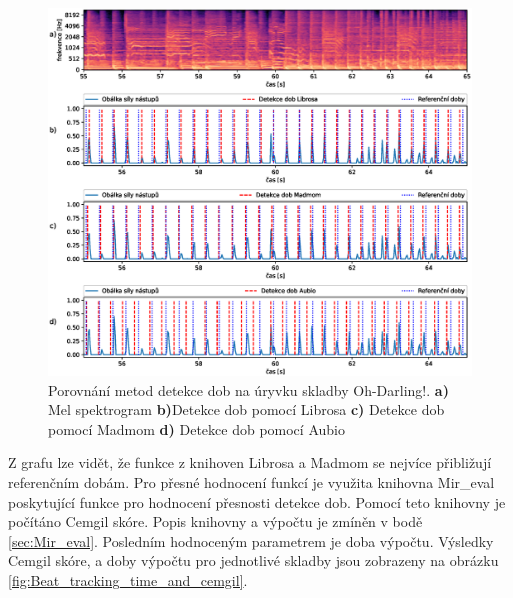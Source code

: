 \begin{figure}[H]
    \centering
    \includegraphics[width = 1\linewidth]{obrazky/Oh-Darling_Beat_analysis_graphs.eps}
    \caption{Porovnání metod detekce dob na úryvku skladby Oh-Darling!. \textbf{a)} Mel spektrogram \textbf{b)}Detekce dob pomocí Librosa \textbf{c)} Detekce dob pomocí Madmom \textbf{d)} Detekce dob pomocí Aubio}
    \label{fig:Oh-Darling_beat_analysis}
\end{figure}

Z grafu lze vidět, že funkce z knihoven Librosa a Madmom se nejvíce přibližují referenčním dobám. Pro přesné hodnocení funkcí je využita knihovna Mir\_eval poskytující funkce pro hodnocení přesnosti detekce dob. Pomocí teto knihovny je počítáno Cemgil skóre. Popis knihovny a výpočtu je zmíněn v bodě \ref{sec:Mir_eval}. Posledním hodnoceným parametrem je doba výpočtu. Výsledky Cemgil skóre, a doby výpočtu pro jednotlivé skladby jsou zobrazeny na obrázku \ref{fig:Beat_tracking_time_and_cemgil}.

